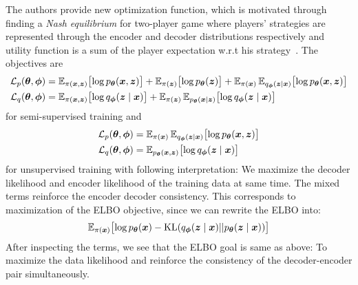 The authors provide new optimization function, which is motivated through finding a \textit{Nash equilibrium} for two-player game 
where players' strategies are represented through the encoder and decoder distributions respectively and utility function is
a sum of the player expectation w.r.t his strategy~\cite{sym-learning-2023}. 
The objectives are 
\begin{align*}
    \mathcal{L}_{p}(\boldsymbol{\theta},\boldsymbol{\phi}) &= \operatorname{\mathbb{E}}_{\pi(\boldsymbol{x},\boldsymbol{z})}\bigl[\log p_{\boldsymbol{\theta}}(\boldsymbol{x},\boldsymbol{z})\bigr]+
                    \operatorname{\mathbb{E}}_{\pi(\boldsymbol{z})}\bigl[\log p_{\boldsymbol{\theta}}(\boldsymbol{z})\bigr] +
                    \operatorname{\mathbb{E}}_{\pi(\boldsymbol{x})}\operatorname{\mathbb{E}}_{q_{\boldsymbol{\phi}}(\boldsymbol{z} \mid\boldsymbol{x})}\bigl[\log p_{\boldsymbol{\theta}}(\boldsymbol{x},\boldsymbol{z})\bigr]\\
    \mathcal{L}_{q}(\boldsymbol{\theta},\boldsymbol{\phi}) &= \operatorname{\mathbb{E}}_{\pi(\boldsymbol{x},\boldsymbol{z})}\bigl[\log q_{\boldsymbol{\phi}}(\boldsymbol{z} \mid \boldsymbol{x})\bigr] + 
    \operatorname{\mathbb{E}}_{\pi(\boldsymbol{z})}\operatorname{\mathbb{E}}_{p_{\boldsymbol{\theta}}(\boldsymbol{x} \mid\boldsymbol{z})} \bigl[\log q_{\boldsymbol{\phi}}(\boldsymbol{z} \mid \boldsymbol{x})\bigr]
\end{align*}
for semi-supervised training and 
\begin{align}
    \mathcal{L}_{p}(\boldsymbol{\theta},\boldsymbol{\phi}) &= \operatorname{\mathbb{E}}_{\pi(\boldsymbol{x})}\operatorname{\mathbb{E}}_{q_{\boldsymbol{\phi}}(\boldsymbol{z} \mid\boldsymbol{x})}\bigl[\log p_{\boldsymbol{\theta}}(\boldsymbol{x},\boldsymbol{z})\bigr] \label{eq:unsup_objective_theta}\\
    \mathcal{L}_{q}(\boldsymbol{\theta},\boldsymbol{\phi}) &= \operatorname{\mathbb{E}}_{p_{\boldsymbol{\theta}}(\boldsymbol{x},\boldsymbol{z})} \bigl[\log q_{\boldsymbol{\phi}}(\boldsymbol{z} \mid \boldsymbol{x})\bigr] \label{eq:unsup_objective_phi}
\end{align}
for unsupervised training with following interpretation: We maximize the decoder likelihood and encoder likelihood of the training data at same time. The mixed 
terms reinforce the encoder decoder consistency. This corresponds to maximization of the ELBO objective, since we can 
rewrite the ELBO into:
$$
\operatorname{\mathbb{E}}_{\pi(\boldsymbol{x})} \bigl[ 
\log p_{\boldsymbol{\theta}}(\boldsymbol{x}) - \mathrm{KL} (q_{\boldsymbol{\phi}}(\boldsymbol{z} \mid \boldsymbol{x}) || 
p_{\boldsymbol{\theta}}(\boldsymbol{z} \mid \boldsymbol{x})) \bigr]
$$
After inspecting the terms, we see that the ELBO goal is same as above: To maximize the data likelihood and reinforce the consistency of the decoder-encoder pair 
simultaneously. 
